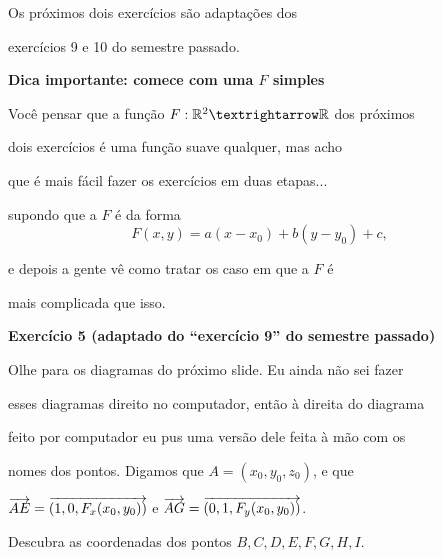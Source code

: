 \documentclass[oneside,12pt]{article}
\begin{document}
\bsk

Os próximos dois exercícios são adaptações dos

exercícios 9 e 10 do semestre passado.

\newpage


{\bf Dica importante: comece com uma $F$ simples}

\ssk

Você  pensar que a função $F:\R^2→\R$ dos próximos

dois exercícios é uma função suave qualquer, mas acho

que é mais fácil fazer os exercícios em duas etapas...

 supondo que a $F$ é da forma
%
$$F(x,y) = a(x-x_0) + b(y-y_0) + c,$$

e depois a gente vê como tratar os caso em que a $F$ é

mais complicada que isso.


\newpage


{\bf Exercício 5 (adaptado do ``exercício 9'' do semestre passado)}

Olhe para os diagramas do próximo slide. Eu ainda não sei fazer

esses diagramas direito no computador, então à direita do diagrama

feito por computador eu pus uma versão dele feita à mão com os

nomes dos pontos. Digamos que $A=(x_0,y_0,z_0)$, e que

$\overrightarrow{AE} = {\overrightarrow{(1,0,F_x(x_0,y_0))}}$ e $\overrightarrow{AG} =
{\overrightarrow{(0,1,F_y(x_0,y_0))}}$.

Descubra as coordenadas dos pontos $B,C,D,E,F,G,H,I$.



\newpage


\def\pictgray#1{{\color{GrayPale}\linethickness{0.3pt}#1}}

\pu
\end{document}
